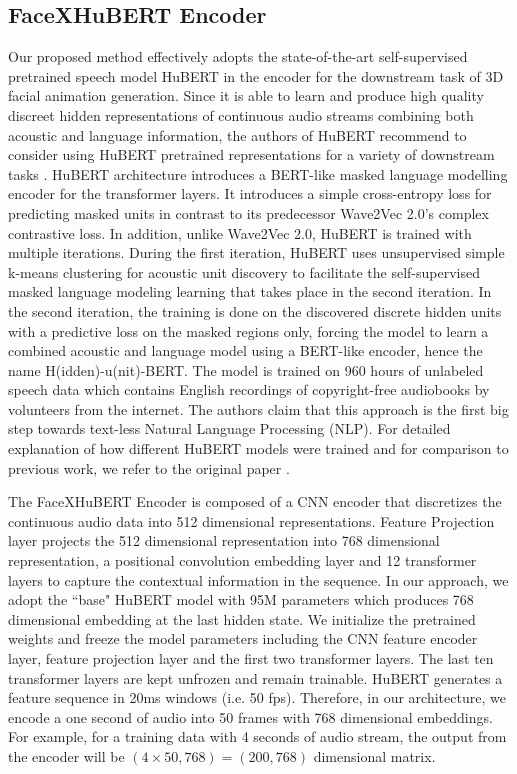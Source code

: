 \documentclass[10pt,twocolumn,letterpaper]{article}
\begin{document}
\subsection{FaceXHuBERT Encoder}
\label{sec:enc}
Our proposed method effectively adopts the state-of-the-art self-supervised pretrained speech model HuBERT in the encoder for the downstream task of 3D facial animation generation. Since it is able to learn and produce high quality discreet hidden representations of continuous audio streams combining both acoustic and language information, the authors of HuBERT recommend to consider using HuBERT pretrained representations for a variety of downstream tasks \cite{HuBERT}. HuBERT architecture introduces a BERT-like \cite{BERT} masked language modelling encoder for the transformer layers. It introduces a simple cross-entropy loss for predicting masked units in contrast to its predecessor Wave2Vec 2.0's \cite{Wav2Vec2} complex contrastive loss. In addition, unlike Wave2Vec 2.0, HuBERT is trained with multiple iterations. During the first iteration, HuBERT uses unsupervised simple k-means clustering for acoustic unit discovery to facilitate the self-supervised masked language modeling learning that takes place in the second iteration. In the second iteration, the training is done on the discovered discrete hidden units with a predictive loss on the masked regions only, forcing the model to learn a combined acoustic and language model using a BERT-like encoder, hence the name H(idden)-u(nit)-BERT. The model is trained on 960 hours of unlabeled speech data \cite{librispeech}  which contains English recordings of copyright-free audiobooks by volunteers from the internet. The authors claim that this approach is the first big step towards text-less Natural Language Processing (NLP). For detailed explanation of how different HuBERT models were trained and for comparison to previous work, we refer to the original paper \cite{HuBERT}. 

The FaceXHuBERT Encoder is composed of a CNN encoder that discretizes the continuous audio data into 512 dimensional representations. Feature Projection layer projects the 512 dimensional representation into 768 dimensional representation, a positional convolution embedding layer and 12 transformer layers to capture the contextual information in the sequence. In our approach, we adopt the ``base" HuBERT model with 95M parameters which produces 768 dimensional embedding at the last hidden state. We initialize the pretrained weights and freeze the model parameters including the CNN feature encoder layer, feature projection layer and the first two transformer layers. The last ten transformer layers are kept unfrozen and remain trainable. HuBERT generates a feature sequence in 20ms windows (i.e. 50 fps). Therefore, in our architecture, we encode a one second of audio into 50 frames with 768 dimensional embeddings. For example, for a training data with 4 seconds of audio stream, the output from the encoder will be $(4\times50, 768) = (200, 768)$ dimensional matrix. 
\vspace{-1em}
\end{document}
